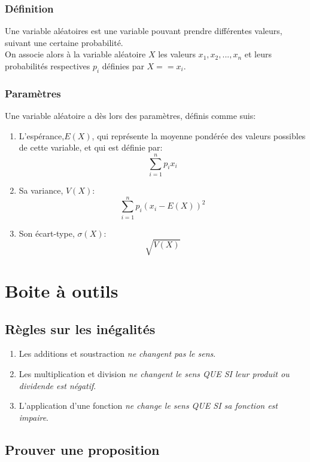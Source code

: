 \documentclass{article}
\begin{document}
\subsubsection{Définition}
    Une variable aléatoires est une variable pouvant prendre différentes valeurs, suivant une certaine probabilité. \\
    On associe alors à la variable aléatoire $X$ les valeurs $x_1, x_2, ..., x_n$ et leurs probabilités respectives $p_i$ définies par $X == x_i$.

\subsubsection{Paramètres}
    Une variable aléatoire a dès lors des paramètres, définis comme suis:
    \begin{enumerate}
        \item L'espérance,$E(X)$, qui représente la moyenne pondérée des valeurs possibles de cette variable, et qui est définie par: $$\sum^n_{i=1}p_ix_i$$
        \item Sa variance, $V(X)$: $$\sum^n_{i=1}p_i(x_i-E(X))^2$$
        \item Son écart-type, $\sigma(X)$: $$\sqrt{V(X)}$$
    \end{enumerate}



\section{Boite à outils}


\subsection{Règles sur les inégalités}
    \begin{enumerate}
        \item Les additions et soustraction \emph{ne changent pas le sens}.
        \item Les multiplication et division \emph{ne changent le sens QUE SI leur produit ou dividende est négatif}.
        \item L'application d'une fonction \emph{ne change le sens QUE SI sa fonction est impaire}.
    \end{enumerate}


\subsection{Prouver une proposition}
\end{document}
